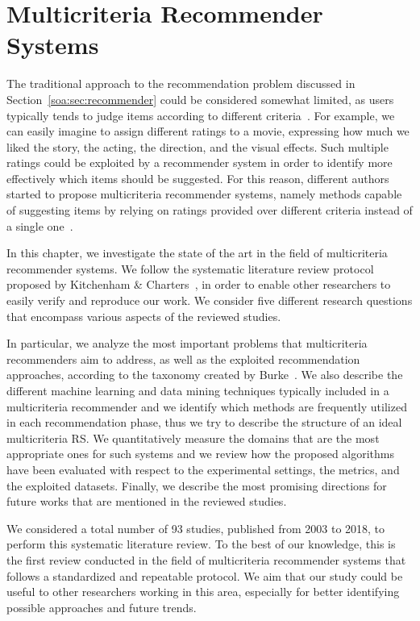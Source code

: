 \chapter{Multicriteria Recommender Systems}
\graphicspath{{Chapter03/Figures/}}
\label{chap:multicriteria}

The traditional approach to the recommendation problem discussed in Section~\ref{soa:sec:recommender} could be considered somewhat limited, as users typically tends to judge items according to different criteria~\cite{Adomavicius2015}. For example, we can easily imagine to assign different ratings to a movie, expressing how much we liked the story, the acting, the direction, and the visual effects. Such multiple ratings could be exploited by a recommender system in order to identify more effectively which items should be suggested. For this reason, different authors started to propose multicriteria recommender systems, namely methods capable of suggesting items by relying on ratings provided over different criteria instead of a single one~\cite{Adomavicius2005,Manouselis2007}.

In this chapter, we investigate the state of the art in the field of multicriteria recommender systems. We follow the systematic literature review protocol proposed by Kitchenham \& Charters~\cite{Kitchenham07}, in order to enable other researchers to easily verify and reproduce our work. We consider five different research questions that encompass various aspects of the reviewed studies.

In particular, we analyze the most important problems that multicriteria recommenders aim to address, as well as the exploited recommendation approaches, according to the taxonomy created by Burke~\cite{Burke2007}. We also describe the different machine learning and data mining techniques typically included in a multicriteria recommender and we identify which methods are frequently utilized in each recommendation phase, thus we try to describe the structure of an ideal multicriteria RS. We quantitatively measure the domains that are the most appropriate ones for such systems and we review how the proposed algorithms have been evaluated with respect to the experimental settings, the metrics, and the exploited datasets. Finally, we describe the most promising directions for future works that are mentioned in the reviewed studies.

We considered a total number of 93 studies, published from 2003 to 2018, to perform this systematic literature review. To the best of our knowledge, this is the first review conducted in the field of multicriteria recommender systems that follows a standardized and repeatable protocol. We aim that our study could be useful to other researchers working in this area, especially for better identifying possible approaches and future trends.

